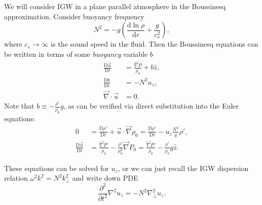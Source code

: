 \documentclass[11pt,
        usenames, %
        dvipsnames %
    ]{article}
\newcommand*{\rd}[2]{\frac{\mathrm{d}#1}{\mathrm{d}#2}}
\newcommand*{\ptd}[2]{\frac{\partial^2 #1}{\partial#2^2}}
\newcommand*{\md}[2]{\frac{\mathrm{D}#1}{\mathrm{D}#2}}
\newcommand*{\p}[1]{\left(#1\right)}
\begin{document}
We will consider IGW in a plane parallel atmosphere in the Boussinesq
approximation. Consider buoyancy frequency
\begin{equation}
    N^2 = -g\p{\rd{\ln \rho}{r} + \frac{g}{c_s^2}},
\end{equation}
where $c_s \to \infty$ is the sound speed in the fluid. Then the Boussinesq
equations can be written in terms of some \emph{buoyancy} variable $b$
\begin{subequations}\label{eq:bouss}
    \begin{align}
        \md{\vec{u}}{t} &= \frac{\vec{\nabla}P}{\rho_0} + b\hat{z},\\
        \md{b}{t} &= -N^2 u_z,\\
        \vec{\nabla} \cdot \vec{u} &= 0.
    \end{align}
\end{subequations}
Note that $b \equiv -\frac{\rho'}{\rho_0} g$, as can be verified via
direct substitution into the Euler equations:
\begin{subequations}\label{eq:bouss}
    \begin{align}
        0 &= \md{\rho'}{t} + \vec{u} \cdot \vec{\nabla}\rho_0 =
            \md{\rho'}{t} - u_z \frac{N^2}{g} \rho',\\
        \md{\vec{u}}{t} &= \frac{\vec{\nabla}P'}{\rho_0}
                - \frac{\rho'}{\rho_0^2} \vec{\nabla} P_0
            = \frac{\vec{\nabla}P'}{\rho_0} - \frac{\rho'}{\rho_0}g\hat{z}.
    \end{align}
\end{subequations}

These equations can be solved for $u_z$, or we can just recall the IGW
dispersion relation $\omega^2 k^2 = N^2k_{\perp}^2$ and write down PDE
\begin{equation}
    \ptd{}{t} \nabla^2 u_z = -N^2\nabla_{\perp}^2 u_z.\label{eq:igw_pde}
\end{equation}
\end{document}
